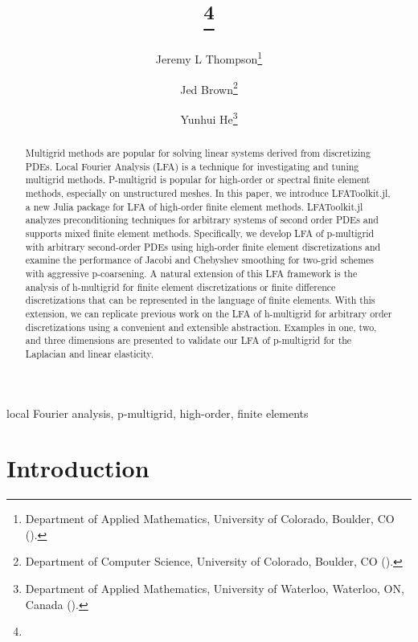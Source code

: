 \documentclass[review]{siamart190516}
\author{
  Jeremy L Thompson\thanks{Department of Applied Mathematics, University of Colorado, Boulder, CO
    (\email{jeremy@jeremylt.org}).}
  \and Jed Brown\thanks{Department of Computer Science, University of Colorado, Boulder, CO
    (\email{jed@jedbrown.org}).}
  \and Yunhui He\thanks{Department of Applied Mathematics, University of Waterloo, Waterloo, ON, Canada
    (\email{yunhui.he@uwaterloo.ca}).}
}
\title{{\TheTitle}\thanks{\TheFunding}}
\begin{document}
\maketitle

\vspace{1cm}

\begin{abstract}
Multigrid methods are popular for solving linear systems derived from discretizing PDEs.
Local Fourier Analysis (LFA) is a technique for investigating and tuning multigrid methods.
P-multigrid is popular for high-order or spectral finite element methods, especially on unstructured meshes.
In this paper, we introduce LFAToolkit.jl, a new Julia package for LFA of high-order finite element methods.
LFAToolkit.jl analyzes preconditioning techniques for arbitrary systems of second order PDEs and supports mixed finite element methods.
Specifically, we develop LFA of p-multigrid with arbitrary second-order PDEs using high-order finite element discretizations and examine the performance of Jacobi and Chebyshev smoothing for two-grid schemes with aggressive p-coarsening.
A natural extension of this LFA framework is the analysis of h-multigrid for finite element discretizations or finite difference discretizations that can be represented in the language of finite elements.
With this extension, we can replicate previous work on the LFA of h-multigrid for arbitrary order discretizations using a convenient and extensible abstraction.
Examples in one, two, and three dimensions are presented to validate our LFA of p-multigrid for the Laplacian and linear elasticity.
\end{abstract}

\begin{keywords}
  local Fourier analysis, p-multigrid, high-order, finite elements
\end{keywords}

\section{Introduction}\label{sec:intro}
\end{document}
